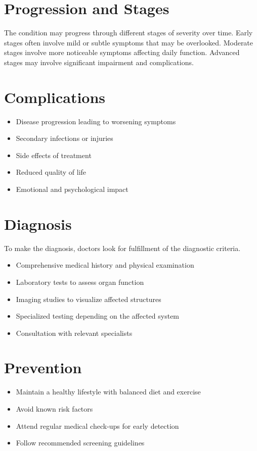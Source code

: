 \section{Progression and Stages}
The condition may progress through different stages of severity over time. Early stages often involve mild or subtle symptoms that may be overlooked. Moderate stages involve more noticeable symptoms affecting daily function. Advanced stages may involve significant impairment and complications.
\section{Complications}
\begin{itemize}[noitemsep]
  \item Disease progression leading to worsening symptoms
  \item Secondary infections or injuries
  \item Side effects of treatment
  \item Reduced quality of life
  \item Emotional and psychological impact
\end{itemize}
\section{Diagnosis}
To make the diagnosis, doctors look for fulfillment of the diagnostic criteria.

\begin{itemize}[noitemsep]
  \item Comprehensive medical history and physical examination
  \item Laboratory tests to assess organ function
  \item Imaging studies to visualize affected structures
  \item Specialized testing depending on the affected system
  \item Consultation with relevant specialists
\end{itemize}
\section{Prevention}
\begin{itemize}[noitemsep]
  \item Maintain a healthy lifestyle with balanced diet and exercise
  \item Avoid known risk factors
  \item Attend regular medical check-ups for early detection
  \item Follow recommended screening guidelines
\end{itemize}
